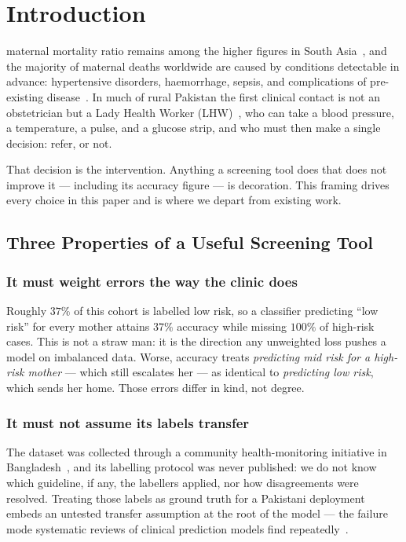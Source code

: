 \documentclass[journal]{IEEEtran}
\begin{document}
\section{Introduction}
 maternal mortality ratio remains among the higher
figures in South Asia~\cite{pmms2019}, and the majority of maternal deaths
worldwide are caused by conditions detectable in advance: hypertensive
disorders, haemorrhage, sepsis, and complications of pre-existing
disease~\cite{say2014global}. In much of rural Pakistan the first clinical
contact is not an obstetrician but a Lady Health Worker
(LHW)~\cite{lhw-evaluation,bhutta2011community}, who can take a blood pressure,
a temperature, a pulse, and a glucose strip, and who must then make a single
decision: refer, or not.

That decision is the intervention. Anything a screening tool does that does not
improve it --- including its accuracy figure --- is decoration. This framing
drives every choice in this paper and is where we depart from existing work.

\subsection{Three Properties of a Useful Screening Tool}

\subsubsection{It must weight errors the way the clinic does}
Roughly $37\%$ of this cohort is labelled low risk, so a classifier predicting
``low risk'' for every mother attains $37\%$ accuracy while missing $100\%$ of
high-risk cases. This is not a straw man: it is the direction any unweighted
loss pushes a model on imbalanced data. Worse, accuracy treats \emph{predicting
mid risk for a high-risk mother} --- which still escalates her --- as identical
to \emph{predicting low risk}, which sends her home. Those errors differ in
kind, not degree.

\subsubsection{It must not assume its labels transfer}
The dataset was collected through a community health-monitoring initiative in
Bangladesh~\cite{ahmed-iot-maternal}, and its labelling protocol was never
published: we do not know which guideline, if any, the labellers applied, nor
how disagreements were resolved. Treating those labels as ground truth for a
Pakistani deployment embeds an untested transfer assumption at the root of the
model --- the failure mode systematic reviews of clinical prediction models find
repeatedly~\cite{wynants2020covid,vancalster2019calibration}.
\end{document}
